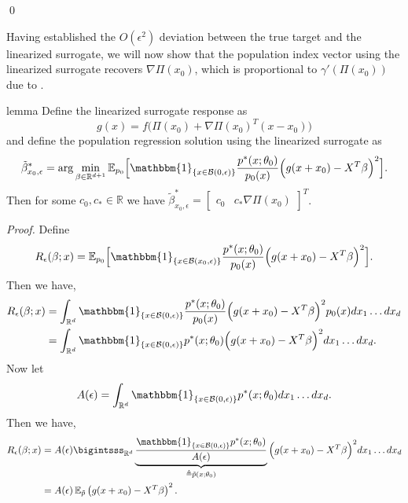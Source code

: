 \documentclass[11pt]{article}
\begin{document}
\qed{}

Having established the $O(\epsilon^2)$ deviation between the true target and the linearized surrogate, we will now show that the population index vector using the linearized surrogate recovers $\nabla\Pi(x_0)$, which is proportional to $\gamma'(\Pi(x_0))$ due to .  

\begin{restatable}[Surrogate]{lemma}{} \label{lemma: surrogate problem} Define the linearized surrogate response as
\[g(x) = f\Big(\Pi(x_0) + \nabla\Pi(x_0)^{T}(x-x_0)\Big)\]
and define the population regression solution using the linearized surrogate as 
\[\tilde{\beta}^*_{x_0, \epsilon} = \arg\min_{\beta \in \mathbb{R}^{d+1}}\mathbb{E}_{ p_{0}}\Big[\mathbbm{1}_{\{x \in \mathcal{B}(0, \epsilon)\}}\frac{p^*(x;\theta_0)}{p_{0}(x)}\Big(g(x + x_0) - X^{T}\beta \Big)^2\Big].\]
Then for some $c_0, c_* \in \mathbb{R}$ we have $\tilde{\beta}^*_{x_0, \epsilon} = \begin{bmatrix}c_0  & c_*\nabla \Pi(x_0) \end{bmatrix}^T$. 
\end{restatable}
\noindent \textit{Proof.} Define 
\[R_{\epsilon}(\beta; x) = \mathbb{E}_{ p_{0}}\Big[\mathbbm{1}_{\{x \in \mathcal{B}(x_0, \epsilon)\}}\frac{p^*(x;\theta_0)}{p_{0}(x)}\Big(g(x + x_0) - X^{T}\beta\Big)^2\Big].\]
Then we have,
\begin{align*}
    R_{\epsilon}(\beta; x)&= \int_{\mathbb{R}^d}\mathbbm{1}_{\{x \in \mathcal{B}(0, \epsilon)\}}\frac{p^*(x;\theta_0)}{p_{0}(x)}\Big(g(x+x_0) - X^{T}\beta\Big)^2p_{0}(x) dx_1 \dots dx_d \\
    &= \int_{\mathbb{R}^d}\mathbbm{1}_{\{x \in \mathcal{B}(0, \epsilon)\}}p^*(x;\theta_0)\Big(g(x + x_0) - X^{T}\beta \Big)^2 dx_1 \dots dx_d.
\end{align*}
Now let 
\begin{equation}
    A(\epsilon) = \int_{\mathbb{R}^d} \mathbbm{1}_{\{x \in \mathcal{B}(0, \epsilon)\}}p^*(x;\theta_0) dx_1 \dots dx_d.
\end{equation}
Then we have,
\begin{align*}
    R_{\epsilon}(\beta; x)&= A(\epsilon) \bigintsss_{\mathbb{R}^d}\underbrace{\frac{\mathbbm{1}_{\{x \in \mathcal{B}(0, \epsilon)\}}p^*(x;\theta_0)}{A(\epsilon)}}_{\triangleq \tilde{p}(x;\theta_0)}\Big(g(x+x_0) - X^{T}\beta \Big)^2 dx_1 \dots dx_d \\
    &= A(\epsilon)\, \mathbb{E}_{ \tilde{p}}\left(g(x+x_0)-X^{T}\beta\right)^2.
\end{align*}
\end{document}
